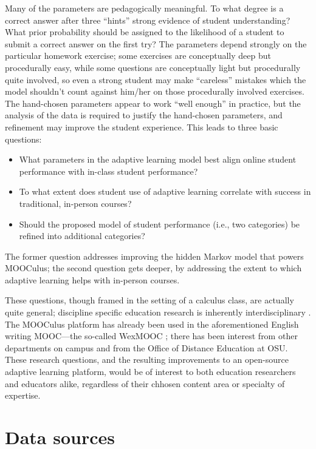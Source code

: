 \documentclass[12pt]{article}
\begin{document}
Many of the parameters are pedagogically meaningful.  To what degree
is a correct answer after three ``hints'' strong evidence of student
understanding?  What prior probability should be assigned to the
likelihood of a student to submit a correct answer on the first try?
The parameters depend strongly on the particular homework exercise;
some exercises are conceptually deep but procedurally easy, while some
questions are conceptually light but procedurally quite involved, so
even a strong student may make ``careless'' mistakes which the model
shouldn't count against him/her on those procedurally involved
exercises.  The hand-chosen parameters appear to work ``well enough''
in practice, but the analysis of the data is required to justify the
hand-chosen parameters, and refinement may improve the student
experience. This leads to three basic questions:
\begin{itemize}
\item What parameters in the adaptive learning model best align online
  student performance with in-class student performance?
\item To what extent does student use of adaptive learning correlate
  with success in traditional, in-person courses?
\item Should the proposed model of student performance (i.e., two
  categories) be refined into additional categories?  
\end{itemize}
The former question addresses improving the hidden Markov model that
powers MOOCulus; the second question gets deeper, by addressing the
extent to which adaptive learning helps with in-person courses.

These questions, though framed in the setting of a calculus class, are
actually quite general; discipline specific education research is
inherently interdisciplinary \cite{dber-report}.  The MOOCulus
platform has already been used in the aforementioned English writing
MOOC---the so-called WexMOOC \parencite{gates-foundation-grant}; there
has been interest from other departments on campus and from the Office
of Distance Education at OSU.  These research questions, and the
resulting improvements to an open-source adaptive learning platform,
would be of interest to both education researchers and educators
alike, regardless of their chhosen content area or specialty of
expertise.

\section{Data sources}
\end{document}

